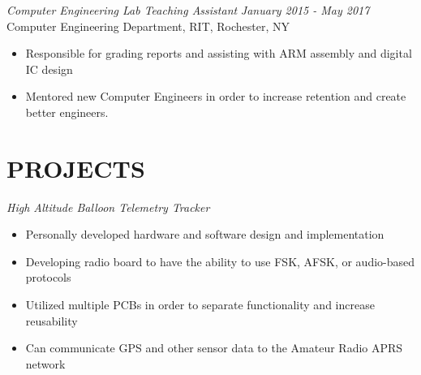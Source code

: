 \documentclass[line,margin]{res}
\begin{document}
\begin{resume}

	\vspace{-5pt}
{\sl Computer Engineering Lab Teaching Assistant } \hfill {\sl January 2015 - May 2017} \\
	Computer Engineering Department, RIT, Rochester, NY
	\begin{itemize}  \itemsep -2pt %
		\item Responsible for grading reports and assisting with ARM assembly and digital IC design
		\item Mentored new Computer Engineers in order to increase retention and create better engineers.
	\end{itemize} 



\section{PROJECTS}
	{\sl High Altitude Balloon Telemetry Tracker }
		\begin{itemize} \itemsep -2pt
			\item Personally developed hardware and software design and implementation
			\item Developing radio board to have the ability to use FSK, AFSK, or audio-based protocols
			\item Utilized multiple PCBs in order to separate functionality and increase reusability
			\item Can communicate GPS and other sensor data to the Amateur Radio APRS network
		\end{itemize}

			

\end{resume}
\end{document}

